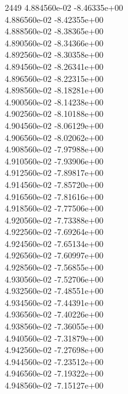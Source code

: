 2449	4.884560e-02	-8.46335e+00	\\ 	4.886560e-02	-8.42355e+00	\\ 	4.888560e-02	-8.38365e+00	\\ 	4.890560e-02	-8.34366e+00	\\ 	4.892560e-02	-8.30358e+00	\\ 	4.894560e-02	-8.26341e+00	\\ 	4.896560e-02	-8.22315e+00	\\ 	4.898560e-02	-8.18281e+00	\\ 	4.900560e-02	-8.14238e+00	\\ 	4.902560e-02	-8.10188e+00	\\ 	4.904560e-02	-8.06129e+00	\\ 	4.906560e-02	-8.02062e+00	\\ 	4.908560e-02	-7.97988e+00	\\ 	4.910560e-02	-7.93906e+00	\\ 	4.912560e-02	-7.89817e+00	\\ 	4.914560e-02	-7.85720e+00	\\ 	4.916560e-02	-7.81616e+00	\\ 	4.918560e-02	-7.77506e+00	\\ 	4.920560e-02	-7.73388e+00	\\ 	4.922560e-02	-7.69264e+00	\\ 	4.924560e-02	-7.65134e+00	\\ 	4.926560e-02	-7.60997e+00	\\ 	4.928560e-02	-7.56855e+00	\\ 	4.930560e-02	-7.52706e+00	\\ 	4.932560e-02	-7.48551e+00	\\ 	4.934560e-02	-7.44391e+00	\\ 	4.936560e-02	-7.40226e+00	\\ 	4.938560e-02	-7.36055e+00	\\ 	4.940560e-02	-7.31879e+00	\\ 	4.942560e-02	-7.27698e+00	\\ 	4.944560e-02	-7.23512e+00	\\ 	4.946560e-02	-7.19322e+00	\\ 	4.948560e-02	-7.15127e+00	\\ \hline
